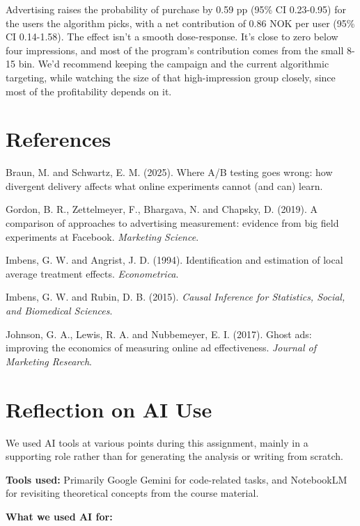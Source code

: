\documentclass[
  letterpaper,
  DIV=11,
  numbers=noendperiod]{scrartcl}
\begin{document}
Advertising raises the probability of purchase by 0.59 pp (95\% CI
0.23-0.95) for the users the algorithm picks, with a net contribution of
0.86 NOK per user (95\% CI 0.14-1.58). The effect isn't a smooth
dose-response. It's close to zero below four impressions, and most of
the program's contribution comes from the small 8-15 bin. We'd recommend
keeping the campaign and the current algorithmic targeting, while
watching the size of that high-impression group closely, since most of
the profitability depends on it.

\section{References}\label{references}

Braun, M. and Schwartz, E. M. (2025). Where A/B testing goes wrong: how
divergent delivery affects what online experiments cannot (and can)
learn.

Gordon, B. R., Zettelmeyer, F., Bhargava, N. and Chapsky, D. (2019). A
comparison of approaches to advertising measurement: evidence from big
field experiments at Facebook. \emph{Marketing Science}.

Imbens, G. W. and Angrist, J. D. (1994). Identification and estimation
of local average treatment effects. \emph{Econometrica}.

Imbens, G. W. and Rubin, D. B. (2015). \emph{Causal Inference for
Statistics, Social, and Biomedical Sciences}.

Johnson, G. A., Lewis, R. A. and Nubbemeyer, E. I. (2017). Ghost ads:
improving the economics of measuring online ad effectiveness.
\emph{Journal of Marketing Research}.

\section{Reflection on AI Use}\label{reflection-on-ai-use}

We used AI tools at various points during this assignment, mainly in a
supporting role rather than for generating the analysis or writing from
scratch.

\textbf{Tools used:} Primarily Google Gemini for code-related tasks, and
NotebookLM for revisiting theoretical concepts from the course material.

\textbf{What we used AI for:}
\end{document}
